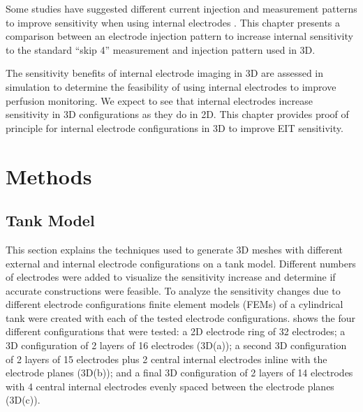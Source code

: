 Some studies have suggested different current injection and measurement patterns
to improve sensitivity when using internal electrodes \parencite{nasehi_tehrani_modelling_2012}.
This chapter presents a comparison between
an electrode injection pattern to increase
internal sensitivity to the standard ``skip 4''
measurement and injection pattern used in 3D.

The sensitivity benefits of internal electrode imaging in 3D are assessed
in simulation to determine the feasibility of using internal electrodes 
to improve perfusion monitoring. 
We expect to see that internal electrodes increase sensitivity in 3D configurations 
as they do in 2D.
This chapter provides proof of principle for internal electrode configurations 
in 3D to 
improve EIT sensitivity.


\section{Methods}

\subsection{Tank Model}
This section explains the techniques used to 
generate 3D meshes with different external and internal 
electrode configurations on a tank model. 
Different numbers of electrodes were added to visualize the sensitivity increase 
and determine if accurate constructions were feasible. 
To analyze the sensitivity changes due to different electrode 
configurations finite element models (FEMs) of a cylindrical tank were 
created with each of the tested electrode configurations.  shows the four 
different configurations that were tested: a 2D 
electrode ring of 32 electrodes; a 3D configuration of 2 layers of 16 
electrodes (3D(a)); a second 3D configuration of 2 layers of 15 electrodes 
plus 2 central internal electrodes inline with the electrode planes (3D(b)); and a final 3D configuration of 
2 layers of 14 electrodes with 4 central internal electrodes evenly spaced between the electrode planes (3D(c)).

